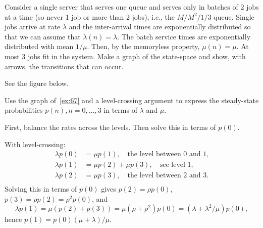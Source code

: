 \begin{exercise}
Consider a single server that serves one queue and serves only in batches of 2 jobs at a time (so never 1 job or more than 2 jobs), i.e., the $M/M^2/1/3$ queue.
 Single jobs arrive at rate $\lambda$ and the inter-arrival times are exponentially distributed so that we can assume that $\lambda(n) = \lambda$.
 The batch service times are exponentially distributed with mean $1/\mu$.
 Then, by the memoryless property, $\mu(n) = \mu$.
 At most 3 jobs fit in the system.
 Make a graph of the state-space and show, with arrows, the transitions that can occur.

\begin{solution}
See the figure below.

\end{solution}
\end{exercise}

\begin{exercise}
 Use the graph of~\cref{ex:67} and a level-crossing argument to express the steady-state probabilities $p(n), n=0,\ldots, 3$ in terms of $\lambda$ and $\mu$.
\begin{hint}
First, balance the rates across the levels. Then solve this in terms of $p(0)$.
\end{hint}
\begin{solution}
With level-crossing:
 \begin{align*}
 \lambda p(0) &= \mu p(1), \quad\text{the level between 0 and 1,}\\
 \lambda p(1) &= \mu p(2) +\mu p(3), \quad\text{see level 1,}\\
 \lambda p(2) &= \mu p(3), \quad\text{the level between 2 and 3.}\\
 \end{align*}
 Solving this in terms of $p(0)$ gives $p(2) = \rho p(0)$, $p(3) = \rho p(2) = \rho^2p(0)$, and
 \begin{equation*}
 \lambda p(1) = \mu(p(2) + p(3)) = \mu (\rho + \rho^2) p(0) = (\lambda + \lambda^2/\mu) p(0),
 \end{equation*}
hence $p(1) = p(0)(\mu + \lambda)/\mu$. 
\end{solution}
\end{exercise}



